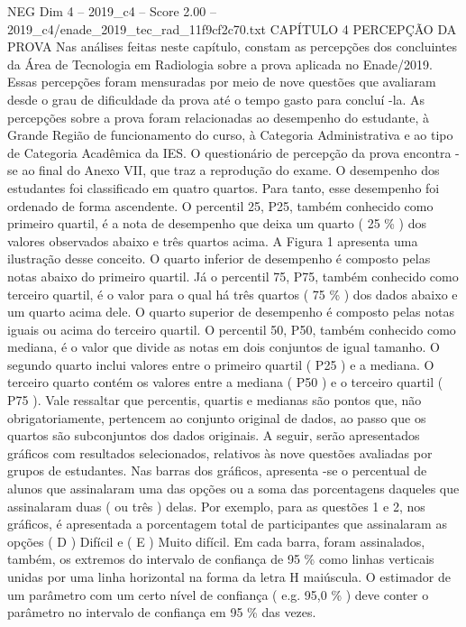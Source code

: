\begin{textsample}{NEG Dim 4 – 2019\_c4 – Score 2.00 – 2019\_c4/enade\_2019\_tec\_rad\_11f9cf2c70.txt}  \label{ex:f4_neg_248}
CAPÍTULO 4 PERCEPÇÃO DA PROVA Nas análises feitas neste capítulo, constam as percepções dos concluintes da Área de Tecnologia em Radiologia sobre a prova aplicada no Enade/2019.
Essas percepções foram mensuradas por meio de nove questões que avaliaram desde o grau de dificuldade da prova até o tempo gasto para concluí -la.
As percepções sobre a prova foram relacionadas ao desempenho do estudante, à Grande Região de funcionamento do curso, à Categoria Administrativa e ao tipo de Categoria Acadêmica da IES.
O questionário de percepção da prova encontra -se ao final do Anexo VII, que traz a reprodução do exame.
O desempenho dos estudantes foi classificado em quatro quartos.
Para tanto, esse desempenho foi ordenado de forma ascendente.
O percentil 25, P25, também conhecido como primeiro quartil, é a nota de desempenho que deixa um quarto ( 25 \% ) dos valores observados abaixo e três quartos acima.
A Figura 1 apresenta uma ilustração desse conceito.
O quarto inferior de desempenho é composto pelas notas abaixo do primeiro quartil.
Já o percentil 75, P75, também conhecido como terceiro quartil, é o valor para o qual há três quartos ( 75 \% ) dos dados abaixo e um quarto acima dele.
O quarto superior de desempenho é composto pelas notas iguais ou acima do terceiro quartil.
O percentil 50, P50, também conhecido como mediana, é o valor que divide as notas em dois conjuntos de igual tamanho.
O segundo quarto inclui valores entre o primeiro quartil ( P25 ) e a mediana.
O terceiro quarto contém os valores entre a mediana ( P50 ) e o terceiro quartil ( P75 ).
Vale ressaltar que percentis, quartis e medianas são pontos que, não obrigatoriamente, pertencem ao conjunto original de dados, ao passo que os quartos são subconjuntos dos dados originais.
A seguir, serão apresentados gráficos com resultados selecionados, relativos às nove questões avaliadas por grupos de estudantes.
Nas barras dos gráficos, apresenta -se o percentual de alunos que assinalaram uma das opções ou a soma das porcentagens daqueles que assinalaram duas ( ou três ) delas.
Por exemplo, para as questões 1 e 2, nos gráficos, é apresentada a porcentagem total de participantes que assinalaram as opções ( D ) Difícil e ( E ) Muito difícil.
Em cada barra, foram assinalados, também, os extremos do intervalo de confiança de 95 \% como linhas verticais unidas por uma linha horizontal na forma da letra H maiúscula.
O estimador de um parâmetro com um certo nível de confiança ( e.g. 95,0 \% ) deve conter o parâmetro no intervalo de confiança em 95 \% das vezes.

\end{textsample}
